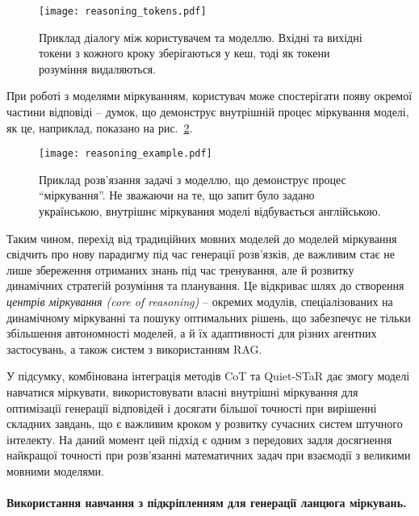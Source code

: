 \begin{figure}[!h]
    \centering
    \texttt{[image: reasoning\_tokens.pdf]}
    \caption{Приклад діалогу між користувачем та моделлю. Вхідні та вихідні токени з кожного кроку зберігаються у кеш, тоді як токени розуміння видаляються.}
    \label{fig:reasoning_window}
\end{figure}

При роботі з моделями міркуванням, користувач може спостерігати появу окремої частини відповіді -- думок, що демонструє внутрішній процес міркування моделі, як це, наприклад, показано на рис.~\ref{fig:reasoning_example}.

\begin{figure}[!h]
    \centering
    \texttt{[image: reasoning\_example.pdf]}
    \caption{Приклад розв'язання задачі з моделлю, що демонструє процес ``міркування''. Не зважаючи на те, що запит було задано українською, внутрішнє міркування моделі відбувається англійською.}
    \label{fig:reasoning_example}
\end{figure}

Таким чином, перехід від традиційних мовних моделей до моделей міркування свідчить про нову парадигму під час генерації розв'язків, де важливим стає не лише збереження отриманих знань під час тренування, але й розвитку динамічних стратегій розуміння та планування. Це відкриває шлях до створення \emph{центрів міркування (core of reasoning)} -- окремих модулів, спеціалізованих на динамічному міркуванні та пошуку оптимальних рішень, що забезпечує не тільки збільшення автономності моделей, а й їх адаптивності для різних агентних застосувань, а також систем з використанням RAG.

У підсумку, комбінована інтеграція методів CoT та Quiet-STaR дає змогу моделі навчатися міркувати, використовувати власні внутрішні міркування для оптимізації генерації відповідей і досягати більшої точності при вирішенні складних завдань, що є важливим кроком у розвитку сучасних систем штучного інтелекту. На даний момент цей підхід є одним з передових задля досягнення найкращої точності при розв'язанні математичних задач при взаємодії з великими мовними моделями.

\paragraph{Використання навчання з підкріпленням для генерації ланцюга міркувань.}

